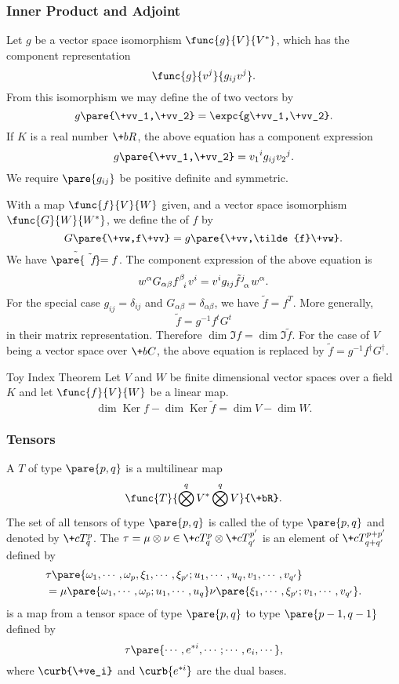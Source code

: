 \documentclass[hidelinks]{article}
\DeclareMathOperator{\Ker}{Ker}
\begin{document}
\subsubsection{Inner Product and Adjoint} %
\label{ssub:inner_product_and_adjoint}

Let $g$ be a vector space isomorphism $\func{g}{V}{V^*}$, which has the component representation
\[ \func{g}{v^j}{g_{ij}v^j}. \]
From this isomorphism we may define the  of two vectors by
\[ g\pare{\+vv_1,\+vv_2} = \expc{g\+vv_1,\+vv_2}. \]
If $K$ is a real number $\+bR$, the above equation has a component expression
\[ g\pare{\+vv_1,\+vv_2} = {v_1}^i g_{ij} {v_2}^j. \]
We require $\pare{g_{ij}}$ be positive definite and symmetric.
\par
With a map $\func{f}{V}{W}$ given, and a vector space isomorphism $\func{G}{W}{W^*}$, we define the  of $f$ by
\[ G\pare{\+vw,f\+vv} = g\pare{\+vv,\tilde{f}\+vw}. \]
We have $\tilde{\pare{\tilde{f}}} = f$. The component expression of the above equation is
\[ w^\alpha G_{\alpha\beta} \tensor{f}{^\beta_i}v^i = v^i g_{ij}\tensor{\tilde{f}}{^j_\alpha}w^\alpha. \]
For the special case $g_{ij} = \delta_{ij}$ and $G_{\alpha\beta} = \delta_{\alpha\beta}$, we have $\tilde{f} = f^T$. More generally,
\[ \tilde{f} = g^{-1}f^t G^t \]
in their matrix representation. Therefore $\dim \Im f = \dim \Im \tilde{f}$. For the case of $V$ being a vector space over $\+bC$, the above equation is replaced by $\tilde{f} = g^{-1} f^\dagger G^\dagger$.
\begin{finaleq}{Toy Index Theorem}
    Let $V$ and $W$ be finite dimensional vector spaces over a field $K$ and let $\func{f}{V}{W}$ be a linear map.
    \[ \dim \Ker f - \dim \Ker \tilde{f} = \dim V - \dim W. \]
\end{finaleq}


\subsubsection{Tensors} %
\label{ssub:tensors}

A  $T$ of type $\pare{p,q}$ is a multilinear map
\[ \func{T}{\bigotimes^q V^* \bigotimes^q V}{\+bR}. \]
The set of all tensors of type $\pare{p,q}$ is called the  of type $\pare{p,q}$ and denoted by $\+cT^p_q$. The  $\tau = \mu\otimes \nu \in \+cT^p_q \otimes \+cT^{p'}_{q'}$ is an element of $\+cT^{p+p'}_{q+q'}$ defined by
\begin{align*}
    & \tau\pare{\omega_1,\cdots,\omega_p,\xi_1,\cdots,\xi_{p'};u_1,\cdots,u_q,v_1,\cdots,v_{q'}} \\
    &= \mu\pare{\omega_1,\cdots,\omega_p;u_1,\cdots,u_q}\nu\pare{\xi_1,\cdots,\xi_{p'}; v_1,\cdots,v_{q'}}.
\end{align*}
 is a map from a tensor space of type $\pare{p,q}$ to type $\pare{p-1,q-1}$ defined by
\[ \tau\pare{\cdots,e^{*i},\cdots;\cdots,e_i,\cdots}, \]
where $\curb{\+ve_i}$ and $\curb{e^{*i}}$ are the dual bases.
\end{document}
